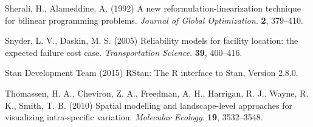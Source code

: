 \documentclass[11pt,]{article}
\begin{document}
Sherali, H., Alameddine, A. (1992) A new reformulation-linearization
technique for bilinear programming problems. \emph{Journal of Global
Optimization}. \textbf{2}, 379--410.

Snyder, L. V., Daskin, M. S. (2005) Reliability models for facility
location: the expected failure cost case. \emph{Transportation Science}.
\textbf{39}, 400--416.

Stan Development Team (2015) RStan: The R interface to Stan, Version
2.8.0.

Thomassen, H. A., Cheviron, Z. A., Freedman, A. H., Harrigan, R. J.,
Wayne, R. K., Smith, T. B. (2010) Spatial modelling and landscape-level
approaches for visualizing intra-specific variation. \emph{Molecular
Ecology}. \textbf{19}, 3532--3548.
\end{document}
